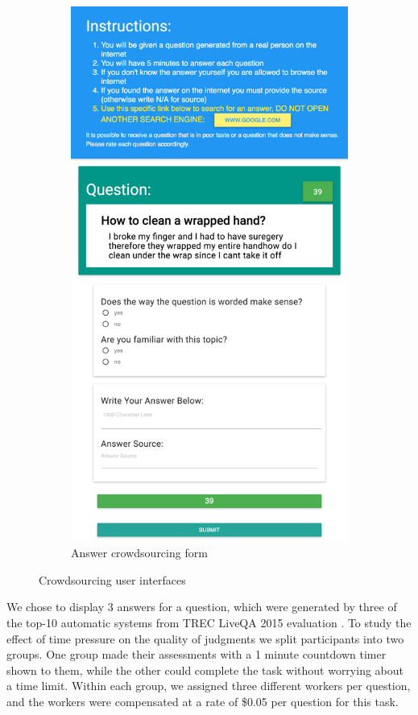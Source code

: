 \begin{figure}
\begin{subfigure}[b]{0.49\textwidth}
\includegraphics[width=0.9\linewidth]{img/answering_screenshot}
\caption{Answer crowdsourcing form}
\label{figure:crowdsourcing:interfaces:answer}
\end{subfigure}

\caption{Crowdsourcing user interfaces}
\label{figure:crowdsourcing:interfaces}
\end{figure}

We chose to display 3 answers for a question, which were generated by three of the top-10 automatic systems from TREC LiveQA 2015 evaluation \cite{overviewliveqa15}.
To study the effect of time pressure on the quality of judgments we split participants into two groups. One group made their assessments with a 1 minute countdown timer shown to them, while the other could complete the task without worrying about a time limit.
Within each group, we assigned three different workers per question, and the workers were compensated at a rate of \$0.05 per question for this task.

